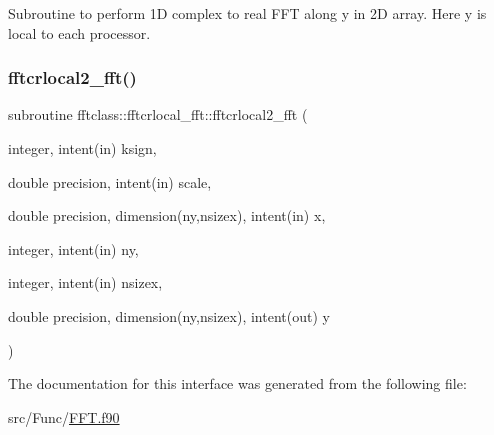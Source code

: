 Subroutine to perform 1D complex to real F\+FT along y in 2D array. Here y is local to each processor. 

\mbox{\label{interfacefftclass_1_1fftcrlocal__fft_a61c3b16caab87c9a268ae178f67aea26}} 
\subsubsection{\texorpdfstring{fftcrlocal2\_fft()}{fftcrlocal2\_fft()}}
{\footnotesize\ttfamily subroutine fftclass\+::fftcrlocal\+\_\+fft\+::fftcrlocal2\+\_\+fft (\begin{DoxyParamCaption}\item[{integer, intent(in)}]{ksign,  }\item[{double precision, intent(in)}]{scale,  }\item[{double precision, dimension(ny,nsizex), intent(in)}]{x,  }\item[{integer, intent(in)}]{ny,  }\item[{integer, intent(in)}]{nsizex,  }\item[{double precision, dimension(ny,nsizex), intent(out)}]{y }\end{DoxyParamCaption})}



The documentation for this interface was generated from the following file\+:\begin{DoxyCompactItemize}
\item 
src/\+Func/\mbox{\hyperlink{_f_f_t_8f90}{F\+F\+T.\+f90}}\end{DoxyCompactItemize}

